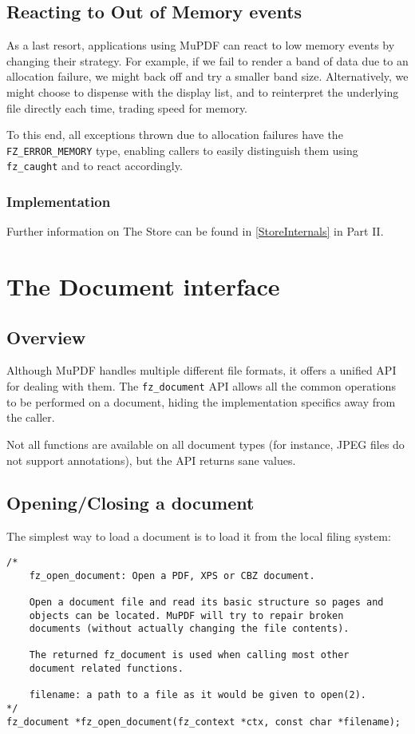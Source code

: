 \documentclass[oneside]{book}
\newcommand{\rjwref}[1] {\autoref{#1} \nameref{#1}}
\begin{document}
\section{Reacting to Out of Memory events}


As a last resort, applications using MuPDF can react to low memory events by changing their strategy. For example, if we fail to render a band of data due to an allocation failure, we might back off and try a smaller band size. Alternatively, we might choose to dispense with the display list, and to reinterpret the underlying file directly each time, trading speed for memory.

To this end, all exceptions thrown due to allocation failures have the \texttt{FZ\_ERROR\_MEMORY} type, enabling callers to easily distinguish them using \texttt{fz\_caught} and to react accordingly.

\subsection{Implementation}

Further information on The Store can be found in \rjwref{StoreInternals} in Part II.

\chapter{The Document interface}
\label{Document}

\section{Overview}

Although MuPDF handles multiple different file formats, it offers a unified API for dealing with them. The \texttt{fz\_document} API allows all the common operations to be performed on a document, hiding the implementation specifics away from the caller.

Not all functions are available on all document types (for instance, JPEG files do not support annotations), but the API returns sane values.


\section{Opening/Closing a document}

The simplest way to load a document is to load it from the local filing system:

\begin{lstlisting}
/*
	fz_open_document: Open a PDF, XPS or CBZ document.

	Open a document file and read its basic structure so pages and
	objects can be located. MuPDF will try to repair broken
	documents (without actually changing the file contents).

	The returned fz_document is used when calling most other
	document related functions.

	filename: a path to a file as it would be given to open(2).
*/
fz_document *fz_open_document(fz_context *ctx, const char *filename);
\end{lstlisting}
\end{document}
